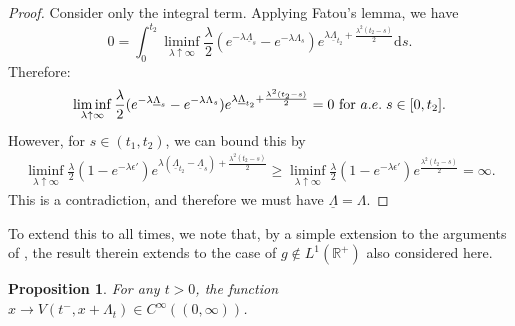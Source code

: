 \documentclass[11pt]{article}
\theoremstyle{plain}
\newtheorem{proposition}[theorem]{Proposition}
\theoremstyle{remark}
\theoremstyle{definition}
\numberwithin{equation}{section}
\begin{document}
\begin{proof}
Consider only the integral term. Applying Fatou's lemma, we have
$$0=\int_0^{t_2}\liminf_{\lambda\uparrow\infty}\frac{\lambda}{2}(e^{-\lambda \underline{\Lambda}_s}-e^{-\lambda \Lambda_{s}})e^{\lambda \underline{\Lambda}_{t_2}+\frac{\lambda^2(t_2-s)}{2}}\textrm{d}s.$$
Therefore:
$$\liminf_{\lambda\uparrow\infty}\frac{\lambda}{2}(e^{-\lambda \underline{\Lambda}_s}-e^{-\lambda \Lambda_{s}})e^{\lambda \underline{\Lambda}_{t_2}+\frac{\lambda^2(t_2-s)}{2}}=0 \textrm{ for }a.e. \hspace{0.1cm}s\in[0,t_2].$$ However, for $s\in (t_1,t_2)$, we can bound this by 
\begin{align*}
    \liminf_{\lambda \uparrow\infty }\frac{\lambda}{2}(1-e^{-\lambda \epsilon'})e^{\lambda (\underline{\Lambda}_{t_2}-\underline{\Lambda}_s)+\frac{\lambda^2(t_2-s)}{2}}\geq \liminf_{\lambda\uparrow\infty}\frac{\lambda}{2}(1-e^{-\lambda \epsilon'})e^{\frac{\lambda^2(t_2-s)}{2}}=\infty.
\end{align*}
This is a contradiction, and therefore we must have $\underline{\Lambda}=\Lambda$. 
\end{proof}

To extend this to all times, we note that, by a simple extension to the arguments of \cite[Proposition 3.2]{5}, the result therein extends to the case of $g\notin L^1(\mathbb{R}^+)$ also considered here. 
\begin{proposition}
    For any $t>0$, the function $x\rightarrow V(t^-,x+\Lambda_t)\in C^\infty((0,\infty))$.
    \label{analyticity}
\end{proposition}
\end{document}
